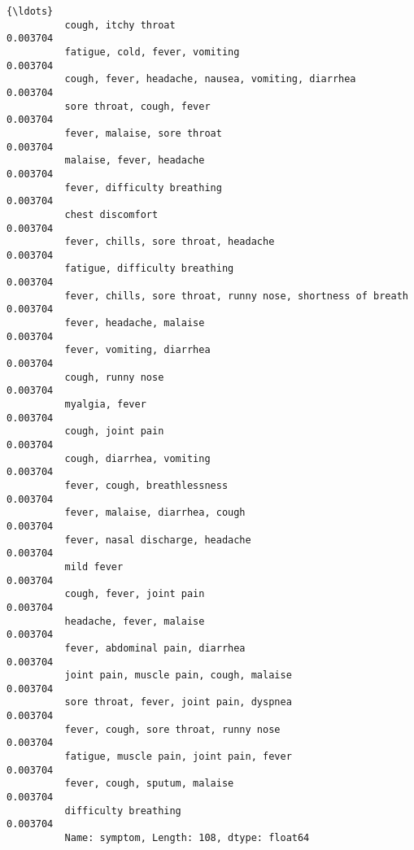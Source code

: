 \documentclass[11pt]{article}
\begin{document}
\begin{Verbatim}[commandchars=\\\{\}]
                                                                           {\ldots}   
          cough, itchy throat                                            0.003704
          fatigue, cold, fever, vomiting                                 0.003704
          cough, fever, headache, nausea, vomiting, diarrhea             0.003704
          sore throat, cough, fever                                      0.003704
          fever, malaise, sore throat                                    0.003704
          malaise, fever, headache                                       0.003704
          fever, difficulty breathing                                    0.003704
          chest discomfort                                               0.003704
          fever, chills, sore throat, headache                           0.003704
          fatigue, difficulty breathing                                  0.003704
          fever, chills, sore throat, runny nose, shortness of breath    0.003704
          fever, headache, malaise                                       0.003704
          fever, vomiting, diarrhea                                      0.003704
          cough, runny nose                                              0.003704
          myalgia, fever                                                 0.003704
          cough, joint pain                                              0.003704
          cough, diarrhea, vomiting                                      0.003704
          fever, cough, breathlessness                                   0.003704
          fever, malaise, diarrhea, cough                                0.003704
          fever, nasal discharge, headache                               0.003704
          mild fever                                                     0.003704
          cough, fever, joint pain                                       0.003704
          headache, fever, malaise                                       0.003704
          fever, abdominal pain, diarrhea                                0.003704
          joint pain, muscle pain, cough, malaise                        0.003704
          sore throat, fever, joint pain, dyspnea                        0.003704
          fever, cough, sore throat, runny nose                          0.003704
          fatigue, muscle pain, joint pain, fever                        0.003704
          fever, cough, sputum, malaise                                  0.003704
          difficulty breathing                                           0.003704
          Name: symptom, Length: 108, dtype: float64
\end{Verbatim}
            
\end{document}
